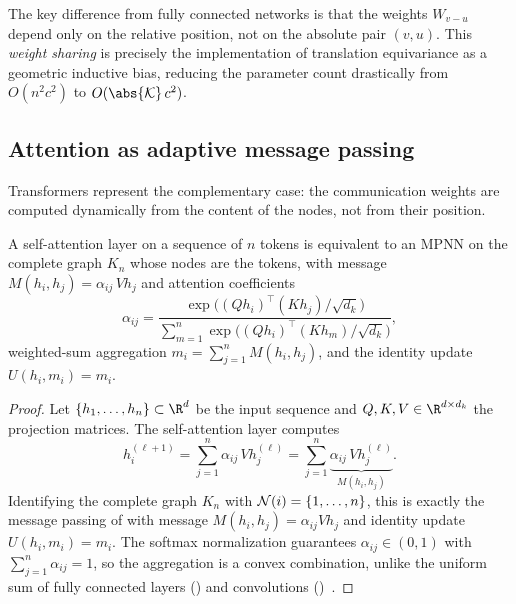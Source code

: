 The key difference from fully connected networks is that the weights $W_{v-u}$
depend only on the relative position, not on the absolute pair $(v, u)$. This
\emph{weight sharing} is precisely the implementation of translation
equivariance as a geometric inductive bias, reducing the parameter count
drastically from $O(n^2 c^2)$ to $O(\abs{\mathcal{K}}\, c^2)$.

\subsection{Attention as adaptive message passing}
\label{subsec:priors:attention-mpnn}

Transformers represent the complementary case: the communication weights are
computed dynamically from the content of the nodes, not from their position.

\begin{proposition}
\label{prop:priors:attention-mpnn}
A self-attention layer on a sequence of $n$ tokens is equivalent to an MPNN on
the complete graph $K_n$ whose nodes are the tokens, with message
$M(h_i, h_j) = \alpha_{ij}\, V h_j$ and attention coefficients
\[
  \alpha_{ij}
    = \frac{\exp\!\bigl((Q h_i)^{\!\top}(K h_j)/\sqrt{d_k}\bigr)}
           {\sum_{m=1}^{n} \exp\!\bigl((Q h_i)^{\!\top}(K h_m)/\sqrt{d_k}\bigr)},
\]
weighted-sum aggregation $m_i = \sum_{j=1}^{n} M(h_i, h_j)$, and the identity
update $U(h_i, m_i) = m_i$.
\end{proposition}

\begin{proof}
Let $\{h_1, \dots, h_n\} \subset \R^d$ be the input sequence and
$Q, K, V \in \R^{d \times d_k}$ the projection matrices. The self-attention
layer computes
\[
  h_i^{(\ell+1)} = \sum_{j=1}^{n} \alpha_{ij}\, V h_j^{(\ell)}
    = \sum_{j=1}^{n} \underbrace{\alpha_{ij}\, V h_j^{(\ell)}}_{M(h_i, h_j)}.
\]
Identifying the complete graph $K_n$ with $\mathcal{N}(i) = \{1, \dots, n\}$, this is
exactly the message passing of  with message
$M(h_i, h_j) = \alpha_{ij} V h_j$ and identity update $U(h_i, m_i) = m_i$. The
softmax normalization guarantees $\alpha_{ij} \in (0, 1)$ with
$\sum_{j=1}^{n} \alpha_{ij} = 1$, so the aggregation is a convex combination,
unlike the uniform sum of fully connected layers
() and convolutions
()~\citep{vaswani2017attentionneed}. \qedhere
\end{proof}

